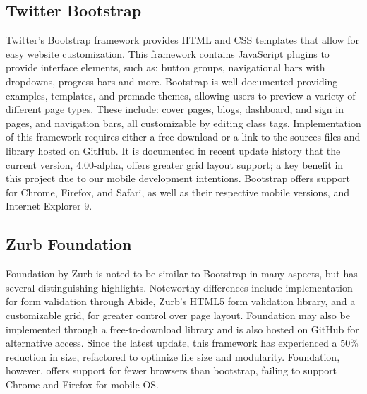 \documentclass[letterpaper,10pt, draftclsnofoot,onecolumn]{IEEEtran}
\begin{document}
{{{{{{{{{\subsection[Twitter Bootstrap]{\color{black}
Twitter Bootstrap}
{\color{black}\normalsize\noindent
{Twitter's Bootstrap framework provides HTML and CSS templates that allow for easy website customization. 
This framework contains JavaScript plugins to provide interface elements, such as: button groups, navigational bars with dropdowns, progress bars and more\cite{website1}.
Bootstrap is well documented providing examples, templates, and premade themes, allowing users to preview a variety of different page types. These include: cover pages, blogs, dashboard, and sign in pages, and navigation bars, all customizable by editing class tags. 
Implementation of this framework requires either a free download or a link to the sources files and library hosted on GitHub. 
It is documented in recent update history that the current version, 4.00-alpha, offers greater grid layout support; a key benefit in this project due to our mobile development intentions. 
Bootstrap offers support for Chrome, Firefox, and Safari, as well as their respective mobile versions, and Internet Explorer 9.
}

\subsection[Zurb Foundation]{\color{black}
Zurb Foundation}
{\color{black}\normalsize\noindent
{Foundation by Zurb is noted to be similar to Bootstrap in many aspects, but has several distinguishing highlights. 
Noteworthy differences include implementation for form validation through Abide, Zurb’s HTML5 form validation library, and a customizable grid, for greater control over page layout\cite{website1}.
Foundation may also be implemented through a free-to-download library and is also hosted on GitHub for alternative access. 
Since the latest update, this framework has experienced a 50\% reduction in size, refactored to optimize file size and modularity. 
Foundation, however, offers support for fewer browsers than bootstrap, failing to support Chrome and Firefox for mobile OS. }

}}}}}}}}}}}
\end{document}
